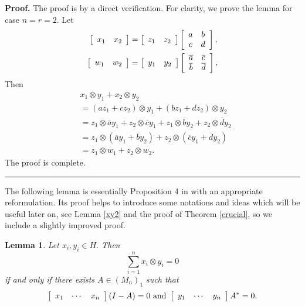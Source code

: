 \documentclass{article}%
\newtheorem{lemma}[theorem]{Lemma}
\newenvironment{proof}[1][Proof]{\noindent\textbf{#1.} }{\ \rule{0.5em}{0.5em}}
\begin{document}
\begin{proof}
The proof is by a direct verification. For clarity, we prove the lemma for
case $n=r=2.$ Let
\begin{align*}
\left[
\begin{array}
[c]{cc}%
x_{1} & x_{2}%
\end{array}
\right]   &  =\left[
\begin{array}
[c]{cc}%
z_{1} & z_{2}%
\end{array}
\right]  \left[
\begin{array}
[c]{cc}%
a & b\\
c & d
\end{array}
\right]  ,\\
\left[
\begin{array}
[c]{cc}%
w_{1} & w_{2}%
\end{array}
\right]   &  =\left[
\begin{array}
[c]{cc}%
y_{1} & y_{2}%
\end{array}
\right]  \left[
\begin{array}
[c]{cc}%
\overline{a} & \overline{c}\\
\overline{b} & \overline{d}%
\end{array}
\right]  ,
\end{align*}
Then%
\begin{align*}
&  x_{1}\otimes y_{1}+x_{2}\otimes y_{2}\\
&  =(az_{1}+cz_{2})\otimes y_{1}+(bz_{1}+dz_{2})\otimes y_{2}\\
&  =z_{1}\otimes\overline{a}y_{1}+z_{2}\otimes\overline{c}y_{1}+z_{1}%
\otimes\overline{b}y_{2}+z_{2}\otimes\overline{d}y_{2}\\
&  =z_{1}\otimes\left(  \overline{a}y_{1}+\overline{b}y_{2}\right)
+z_{2}\otimes\left(  \overline{c}y_{1}+\overline{d}y_{2}\right) \\
&  =z_{1}\otimes w_{1}+z_{2}\otimes w_{2}.
\end{align*}
The proof is complete.
\end{proof}

The following lemma is essentially Proposition 4 in \cite{GuZheng} with an
appropriate reformulation. Its proof helps to introduce some notations and
ideas which will be useful later on, see Lemma \ref{xy2} and the proof of
Theorem \ref{crucial}, so we include a slightly improved proof.

\begin{lemma}
\label{xy}Let $x_{i},y_{i}\in H.$ Then
\[
\sum_{i=1}^{n}x_{i}\otimes y_{i}=0
\]
if and only if there exists $A\in\left(  M_{n}\right)  _{1}$ such that
\begin{equation}
\left[
\begin{array}
[c]{ccc}%
x_{1} & \cdots & x_{n}%
\end{array}
\right]  (I-A)=0\text{ and }\left[
\begin{array}
[c]{ccc}%
y_{1} & \cdots & y_{n}%
\end{array}
\right]  A^{\ast}=0. \label{permute0}%
\end{equation}

\end{lemma}
\end{document}
